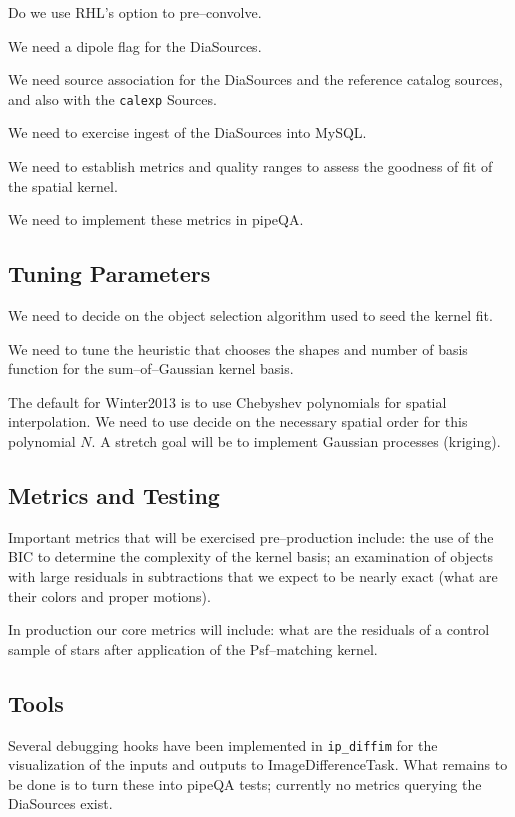 \documentclass[12pt]{article}
\begin{document}
Do we use RHL's option to pre--convolve.

We need a dipole flag for the DiaSources.

We need source association for the DiaSources and the reference
catalog sources, and also with the {\tt calexp} Sources.

We need to exercise ingest of the DiaSources into MySQL.

We need to establish metrics and quality ranges to assess the goodness
of fit of the spatial kernel.

We need to implement these metrics in pipeQA.

\subsection{Tuning Parameters}
We need to decide on the object selection algorithm used to seed the
kernel fit.

We need to tune the heuristic that chooses the shapes and number of
basis function for the sum--of--Gaussian kernel basis.

The default for Winter2013 is to use Chebyshev polynomials for spatial
interpolation.  We need to use decide on the necessary spatial order
for this polynomial $N$.  A stretch goal will be to implement Gaussian
processes (kriging).

\subsection{Metrics and Testing}

Important metrics that will be exercised pre--production include: the
use of the BIC to determine the complexity of the kernel basis; an
examination of objects with large residuals in subtractions that we
expect to be nearly exact (what are their colors and proper motions).

In production our core metrics will include: what are the residuals of
a control sample of stars after application of the Psf--matching
kernel.

\subsection{Tools}
Several debugging hooks have been implemented in {\tt ip\_diffim} for
the visualization of the inputs and outputs to ImageDifferenceTask.
What remains to be done is to turn these into pipeQA tests; currently
no metrics querying the DiaSources exist.
\end{document}
